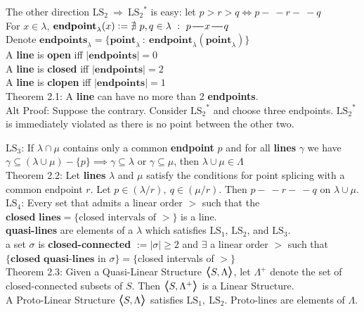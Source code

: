 \documentclass{article}
\newcommand{\hsp}[1][5]{\hspace{0.#1 cm}}
\newcommand{\hcm}[1][1]{\hspace{#1 cm}}
\newcommand{\bra}[1][1.2]{\scalebox{#1}{$\boldsymbol{\langle}$}}
\newcommand{\nl}[1][12]{\\[#1pt]}
\newcommand{\ket}[1][1.2]{\scalebox{#1}{$\boldsymbol{\rangle}$}}
\newcommand{\imp}{\ \Rightarrow\ }
\newcommand{\st}{\ : \ }
\newcommand{\defeq}{\vcentcolon=}
\newcommand{\ch}[1]{\text{#1}}
\newcommand {\chb}[1]{\textbf{#1}}
\newcommand{\seg}{\!-\!\!\!\!\:-}
\begin{document}
\begin{flushleft}
\hcm The other direction $\ch{LS}_2 \imp {\ch{LS}_2}^*$ is easy: let $p>r>q \iff p\seg r\seg q$\nl[12]

\hsp[2] For $x \in \lambda$, $\chb{endpoint}_\lambda(x) \defeq \nexists\ p,q \in \lambda \st p\seg x \seg q$\\
\hsp[2] Denote $\chb{endpoints}_\lambda = \{\chb{point}_\lambda \st \chb{endpoint}_\lambda(\chb{point}_\lambda)\}$\\[6pt]\hsp[2]
A \chb{line} is \chb{open} iff $|\chb{endpoints}|=0$\\\hsp[2]
A \chb{line} is \chb{closed} iff $|\chb{endpoints}|=2$\\\hsp[2]
A \chb{line} is \chb{clopen} iff $|\chb{endpoints}|=1$\nl\hsp[2]
Theorem 2.1: A \chb{line} can have no more than 2 \chb{endpoints}.\\\hcm
{\color{purple}
	Alt Proof: Suppose the contrary. Consider ${\ch{LS}_2}^*$ and choose three endpoints. ${\ch{LS}_2}^*$ is immediately violated as there is no point between the other two.\nl[10]
}

$\ch{LS}_3$: If $\lambda \cap \mu$ contains only a common \chb{endpoint} $p$ and for all \chb{lines} $\gamma$ we have {\color{purple} $\gamma \subseteq (\lambda \cup \mu) - \{p\} \implies \gamma \subseteq \lambda$ or $\gamma \subseteq \mu$}, then $\lambda \cup \mu \in \Lambda$\nl[10]

\hsp[2] Theorem 2.2: Let \chb{lines} $\lambda$ and $\mu$ satisfy the conditions for point splicing with a common endpoint $r$. Let $p \in (\lambda/r),\ q\in (\mu/r)$. Then $p\seg r \seg q$ on $\lambda\cup \mu$.\nl[10]

$\ch{LS}_4$: Every set that admits a linear order $>$ such that the $\chb{closed lines} = \{\ch{closed intervals of }>\}$ is a line.\nl[10]

\chb{quasi-lines} are elements of a $\lambda$ which satisfies $\ch{LS}_1$, $\ch{LS}_2$, and $\ch{LS}_3$.\nl[2]
a set $\sigma$ is \chb{closed-connected} $ := |\sigma| \geq 2 $ and $\exists$ a linear order $>$ such that \\\hcm$\{\chb{closed quasi-lines}$ in $\sigma\} = \{$closed intervals of $>\}$\nl[10]

Theorem 2.3: Given a Quasi-Linear Structure $\bra S, \Lambda\ket$, let $\Lambda^+$ denote the set of closed-connected subsets of $S$. Then $\bra S, \Lambda^+\ket $ is a Linear Structure.\nl[10]

A Proto-Linear Structure $\bra S, \Lambda\ket$ satisfies $\ch{LS}_1,\ \ch{LS}_2$. Proto-lines are elements of $\Lambda$.\nl[10]


\end{flushleft}
\end{document}
